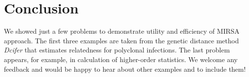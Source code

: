 \documentclass[12pt]{article}
\begin{document}
\section{Conclusion}

We showed just a few problems to demonstrate utility and efficiency of MIRSA approach. The first three examples are taken from the genetic distance method \textit{Dcifer} that estimates relatedness for polyclonal infections. The last problem appears, for example, in calculation of higher-order statistics. We welcome any feedback and would be happy to hear about other examples and to include them!
\end{document}
